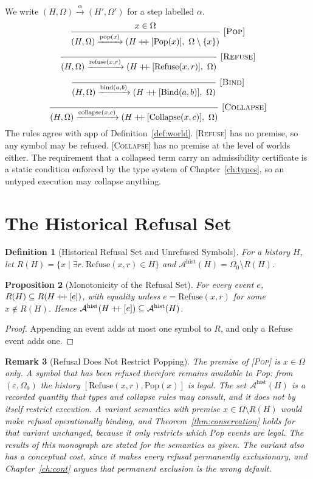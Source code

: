 \documentclass[12pt,oneside,openany]{book}
\theoremstyle{spherepop}
\newtheorem{definition}{Definition}[chapter]
\newtheorem{proposition}[definition]{Proposition}
\theoremstyle{remarkstyle}
\newtheorem{remark}[definition]{Remark}
\newcommand{\Pop}{\mathrm{Pop}}
\newcommand{\Rfuse}{\mathrm{Refuse}}
\newcommand{\Bind}{\mathrm{Bind}}
\newcommand{\Col}{\mathrm{Collapse}}
\newcommand{\hconcat}{\mathbin{+\mkern-5mu+}}
\newcommand{\calA}{\mathcal{A}}
\begin{document}
We write $(H,\Omega)\xrightarrow{\alpha}(H',\Omega')$ for a step labelled $\alpha$.
\[
\frac{x\in\Omega}{(H,\Omega)\xrightarrow{\mathrm{pop}(x)}(H\hconcat[\Pop(x)],\ \Omega\setminus\{x\})}\ \textsc{[Pop]}
\]
\[
\frac{}{(H,\Omega)\xrightarrow{\mathrm{refuse}(x,r)}(H\hconcat[\Rfuse(x,r)],\ \Omega)}\ \textsc{[Refuse]}
\]
\[
\frac{}{(H,\Omega)\xrightarrow{\mathrm{bind}(a,b)}(H\hconcat[\Bind(a,b)],\ \Omega)}\ \textsc{[Bind]}
\]
\[
\frac{}{(H,\Omega)\xrightarrow{\mathrm{collapse}(x,c)}(H\hconcat[\Col(x,c)],\ \Omega)}\ \textsc{[Collapse]}
\]
The rules agree with $\mathrm{app}$ of Definition~\ref{def:world}. \textsc{[Refuse]} has no premise, so any symbol may be refused. \textsc{[Collapse]} has no premise at the level of worlds either. The requirement that a collapsed term carry an admissibility certificate is a static condition enforced by the type system of Chapter~\ref{ch:types}, so an untyped execution may collapse anything.

\section{The Historical Refusal Set}

\begin{definition}[Historical Refusal Set and Unrefused Symbols]
\label{def:admissible-futures}
For a history $H$, let $R(H)=\{x\mid \exists r.\ \Rfuse(x,r)\in H\}$ and $\calA^{\mathrm{hist}}(H)=\Omega_0\setminus R(H)$.
\end{definition}

\begin{proposition}[Monotonicity of the Refusal Set]
\label{def:admissibility-contraction}
For every event $e$, $R(H)\subseteq R(H\hconcat[e])$, with equality unless $e=\Rfuse(x,r)$ for some $x\notin R(H)$. Hence $\calA^{\mathrm{hist}}(H\hconcat[e])\subseteq\calA^{\mathrm{hist}}(H)$.
\end{proposition}

\begin{proof}
Appending an event adds at most one symbol to $R$, and only a Refuse event adds one.
\end{proof}

\begin{remark}[Refusal Does Not Restrict Popping]
\label{rem:refusal-pop}
The premise of \textsc{[Pop]} is $x\in\Omega$ only. A symbol that has been refused therefore remains available to Pop: from $(\varepsilon,\Omega_0)$ the history $[\Rfuse(x,r),\Pop(x)]$ is legal. The set $\calA^{\mathrm{hist}}(H)$ is a recorded quantity that types and collapse rules may consult, and it does not by itself restrict execution. A variant semantics with premise $x\in\Omega\setminus R(H)$ would make refusal operationally binding, and Theorem~\ref{thm:conservation} holds for that variant unchanged, because it only restricts which Pop events are legal. The results of this monograph are stated for the semantics as given. The variant also has a conceptual cost, since it makes every refusal permanently exclusionary, and Chapter~\ref{ch:cont} argues that permanent exclusion is the wrong default.
\end{remark}
\end{document}
